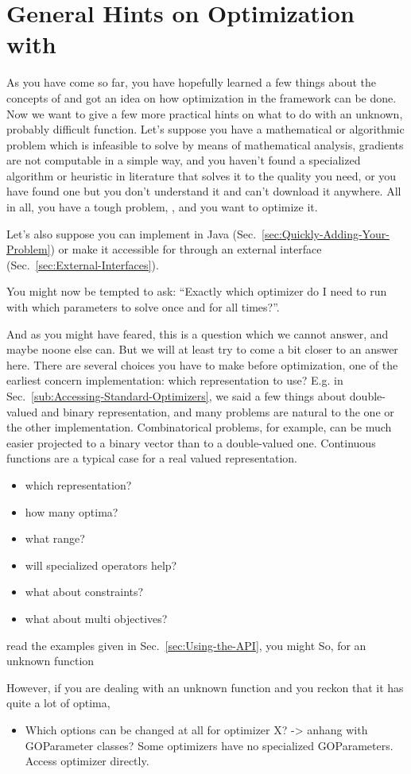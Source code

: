 \chapter{General Hints on Optimization with }

As you have come so far, you have hopefully learned a few things about
the concepts of and got an idea on how optimization
in the framework can be done. Now we want to give a few more practical
hints on what to do with an unknown, probably difficult function.
Let's suppose you have a mathematical or algorithmic problem which
is infeasible to solve by means of mathematical analysis, gradients
are not computable in a simple way, and you haven't found a specialized
algorithm or heuristic in literature that solves it to the quality
you need, or you have found one but you don't understand it and can't
download it anywhere. All in all, you have a tough problem, ,
and you want to optimize it.

Let's also suppose you can implement  in Java
(Sec.~\ref{sec:Quickly-Adding-Your-Problem}) or make it accessible
for through an external interface (Sec.~\ref{sec:External-Interfaces}). 

You might now be tempted to ask: ``Exactly which optimizer do I need
to run with which parameters to solve  once and
for all times?''.

And as you might have feared, this is a question which we cannot answer,
and maybe noone else can. But we will at least try to come a bit closer
to an answer here. There are several choices you have to make before
optimization, one of the earliest concern implementation: which representation
to use? E.g. in Sec.~\ref{sub:Accessing-Standard-Optimizers}, we
said a few things about double-valued and binary representation, and
many problems are natural to the one or the other implementation.
Combinatorical problems, for example, can be much easier projected
to a binary vector than to a double-valued one. Continuous functions
are a typical case for a real valued representation.
\begin{itemize}
\item which representation? 
\item how many optima? 
\item what range? 
\item will specialized operators help?
\item what about constraints?
\item what about multi objectives?
\end{itemize}
read the examples given in Sec.~\ref{sec:Using-the-API}, you might
So, for an unknown function

However, if you are dealing with an unknown function and you reckon
that it has quite a lot of optima, 
\begin{itemize}
\item Which options can be changed at all for optimizer X? -> anhang with
GOParameter classes? Some optimizers have no specialized GOParameters.
Access optimizer directly.
\end{itemize}